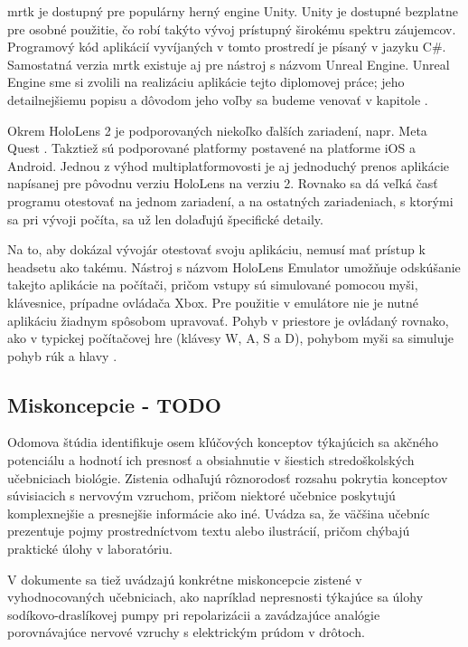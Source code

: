 \acrshort{mrtk} je dostupný pre populárny herný engine Unity. Unity je dostupné bezplatne pre osobné použitie, čo robí takýto vývoj prístupný širokému spektru záujemcov.
Programový kód aplikácií vyvíjaných v tomto prostredí je písaný v jazyku C\#. Samostatná verzia \acrshort{mrtk} existuje aj pre nástroj s názvom Unreal Engine. Unreal
Engine sme si zvolili na realizáciu aplikácie tejto diplomovej práce; jeho detailnejšiemu popisu a dôvodom jeho voľby sa budeme venovať v kapitole .

Okrem HoloLens 2 je podporovaných niekoľko ďalších zariadení, napr. Meta Quest \cite{microsoftWhatMixedReality}. Takztiež sú podporované platformy postavené na platforme
iOS a Android. Jednou z výhod multiplatformovosti je aj jednoduchý prenos aplikácie napísanej pre pôvodnu verziu HoloLens na verziu 2. Rovnako sa dá veľká časť programu
otestovať na jednom zariadení, a na ostatných zariadeniach, s ktorými sa pri vývoji počíta, sa už len dolaďujú špecifické detaily.

Na to, aby dokázal vývojár otestovať svoju aplikáciu, nemusí mať prístup k headsetu ako takému. Nástroj s názvom HoloLens Emulator umožňuje odskúšanie takejto aplikácie 
na počítači, pričom vstupy sú simulované pomocou myši, klávesnice, prípadne ovládača Xbox. Pre použitie v emulátore nie je nutné aplikáciu žiadnym spôsobom upravovať. 
Pohyb v priestore je ovládaný rovnako, ako v typickej počítačovej hre (klávesy W, A, S a D), pohybom myši sa simuluje pohyb rúk a hlavy \cite{microsoftUsingHoloLensEmulator}.

\subsection{Miskoncepcie - TODO}
Odomova štúdia \cite{odomActionPotentialsBiology1993} identifikuje osem kľúčových konceptov týkajúcich sa akčného potenciálu a hodnotí ich presnosť a obsiahnutie v šiestich 
stredoškolských učebniciach biológie. Zistenia odhaľujú rôznorodosť rozsahu pokrytia konceptov súvisiacich s nervovým vzruchom, pričom niektoré učebnice poskytujú komplexnejšie 
a presnejšie informácie ako iné. Uvádza sa, že väčšina učebníc prezentuje pojmy prostredníctvom textu alebo ilustrácií, pričom chýbajú praktické úlohy v laboratóriu. 

V dokumente sa tiež uvádzajú konkrétne miskoncepcie zistené v vyhodnocovaných učebniciach, ako napríklad nepresnosti týkajúce sa úlohy sodíkovo-draslíkovej pumpy pri repolarizácii 
a zavádzajúce analógie porovnávajúce nervové vzruchy s elektrickým prúdom v drôtoch. 

